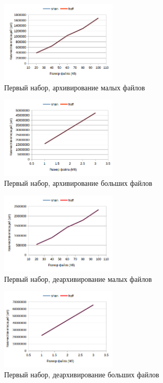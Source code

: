 \documentclass[a4paper,12pt]{article} %
\begin{document}
    \begin{figure}[!htb]
        \caption{Первый набор, архивирование малых файлов}
        \centering
        \includegraphics[width=0.5\textwidth]{graphs/2/1_c_kb}
    \end{figure}
    \begin{figure}[!htb]
        \caption{Первый набор, архивирование больших файлов}
        \centering
        \includegraphics[width=0.5\textwidth]{graphs/2/1_c_mb}
    \end{figure}
    \begin{figure}[!htb]
        \caption{Первый набор, деархивирование малых файлов}
        \centering
        \includegraphics[width=0.5\textwidth]{graphs/2/1_d_kb}
    \end{figure}
    \begin{figure}[!htb]
        \caption{Первый набор, деархивирование больших файлов}
        \centering
        \includegraphics[width=0.5\textwidth]{graphs/2/1_d_mb}
    \end{figure}
\end{document}
